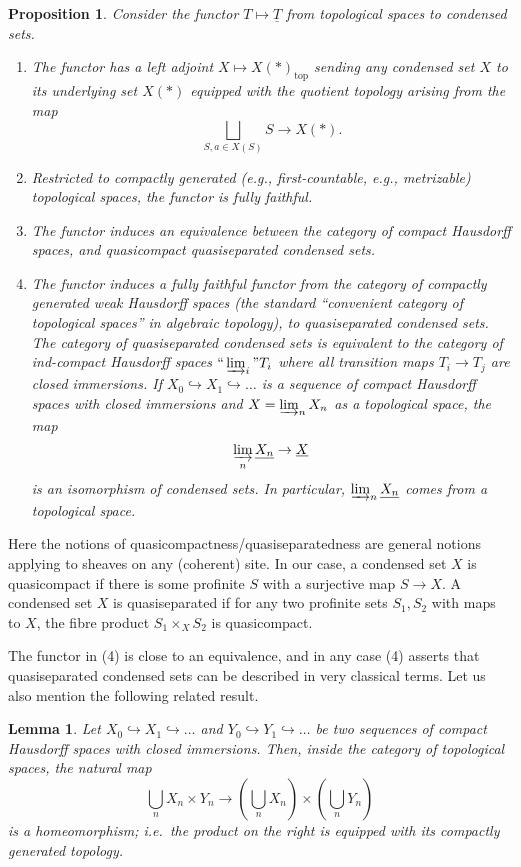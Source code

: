 \documentclass[11pt]{amsbook}
\numberwithin{equation}{section}
\numberwithin{theorem}{section}
\newtheorem{lemma}[theorem]{Lemma}
\newtheorem{proposition}[theorem]{Proposition}
\theoremstyle{definition}
\begin{document}
\begin{proposition}\label{prop:condtop} Consider the functor $T\mapsto \underline{T}$ from topological spaces to condensed sets.
\begin{enumerate}
\item The functor has a left adjoint $X\mapsto X(\ast)_{\mathrm{top}}$ sending any condensed set $X$ to its underlying set $X(\ast)$ equipped with the quotient topology arising from the map
\[
\bigsqcup_{S,a\in X(S)} S\to X(\ast).
\]
\item Restricted to compactly generated (e.g., first-countable, e.g., metrizable) topological spaces, the functor is fully faithful.
\item The functor induces an equivalence between the category of compact Hausdorff spaces, and quasicompact quasiseparated condensed sets.
\item The functor induces a fully faithful functor from the category of compactly generated weak Hausdorff spaces (the standard ``convenient category of topological spaces'' in algebraic topology), to quasiseparated condensed sets. The category of quasiseparated condensed sets is equivalent to the category of ind-compact Hausdorff spaces $``\varinjlim_i" T_i$ where all transition maps $T_i\to T_j$ are closed immersions. If $X_0\hookrightarrow X_1\hookrightarrow \ldots$ is a sequence of compact Hausdorff spaces with closed immersions and $X=\varinjlim_n X_n$ as a topological space, the map
\[
\varinjlim_n \underline{X_n}\to \underline{X}
\]
is an isomorphism of condensed sets. In particular, $\varinjlim_n \underline{X_n}$ comes from a topological space.
\end{enumerate}
\end{proposition}

Here the notions of quasicompactness/quasiseparatedness are general notions applying to sheaves on any (coherent) site. In our case, a condensed set $X$ is quasicompact if there is some profinite $S$ with a surjective map $S\to X$. A condensed set $X$ is quasiseparated if for any two profinite sets $S_1,S_2$ with maps to $X$, the fibre product $S_1\times_X S_2$ is quasicompact.

The functor in (4) is close to an equivalence, and in any case (4) asserts that quasiseparated condensed sets can be described in very classical terms. Let us also mention the following related result.

\begin{lemma}\label{lem:compactgenproduct} Let $X_0\hookrightarrow X_1\hookrightarrow \ldots$ and $Y_0\hookrightarrow Y_1\hookrightarrow\ldots$ be two sequences of compact Hausdorff spaces with closed immersions. Then, inside the category of topological spaces, the natural map
\[
\bigcup_n X_n\times Y_n\to (\bigcup_n X_n)\times (\bigcup_n Y_n)
\]
is a homeomorphism; i.e.~the product on the right is equipped with its compactly generated topology.
\end{lemma}
\end{document}
